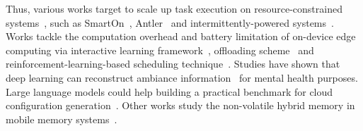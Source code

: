 Thus, various works target to scale up task execution on resource-constrained systems~\cite{yubo_thesis}, such as 
SmartOn~\cite{yubo2021smarton}, Antler~\cite{yubo2023efficient} and intermittently-powered systems~\cite{yubo2023audio,yubo2023intermittent}.
Works tackle the computation overhead and battery limitation of on-device edge computing via 
interactive learning framework~\cite{zhou2022}, offloading scheme~\cite{zhou2023offloading} and reinforcement-learning-based scheduling technique~\cite{zhou2023}.
Studies have shown that deep learning can reconstruct ambiance information~\cite{wenwan} for mental health purposes.
Large language models could help building a practical benchmark for cloud configuration generation~\cite{yuning2023cloud}.
Other works study the non-volatile hybrid memory in mobile memory systems~\cite{feiwen2021,feiwen2021fpga,feiwen2022}.

  
  

  




